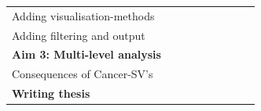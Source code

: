 \documentclass[twoside,fontsize=10pt]{article}
\begin{document}
\begin{center}
\begin{table}[h]
\begin{tabular}{lllllllll}
\hspace*{1em} Adding visualisation-methods      &                                                 &                                                 & \cellcolor[HTML]{656565}                        & \cellcolor[HTML]{656565}                        &                                                 &                                                 &                                                 &                                                 \\
\hspace*{1em} Adding filtering and output       &                                                 &                                                 &                                                 & \cellcolor[HTML]{656565}                        &                                                 &                                                 &                                                 &                                                 \\
\textbf{Aim 3: Multi-level analysis}            &                                                 &                                                 &                                                 &                                                 & \cellcolor[HTML]{343434}{\color[HTML]{343434} } & \cellcolor[HTML]{343434}{\color[HTML]{343434} } & \cellcolor[HTML]{343434}{\color[HTML]{343434} } & \cellcolor[HTML]{343434}{\color[HTML]{343434} } \\
\hspace*{1em} Consequences of Cancer-SV's       &                                                 &                                                 &                                                 &                                                 & \cellcolor[HTML]{656565}                        & \cellcolor[HTML]{656565}                        & \cellcolor[HTML]{656565}                        & \cellcolor[HTML]{656565}                        \\
\textbf{Writing thesis}                         &                                                 &                                                 &                                                 &                                                 &                                                 &                                                 &                                                 & \cellcolor[HTML]{343434}                       
\end{tabular}
\end{table}

\end{center}
\end{document}
